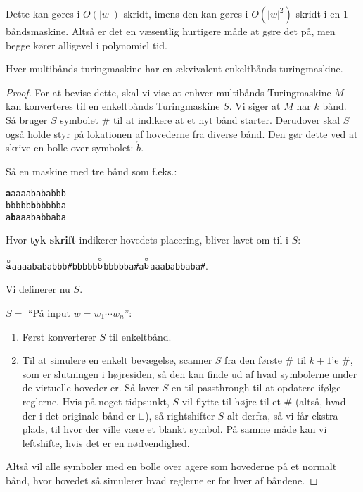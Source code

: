 Dette kan gøres i $O(|w|)$ skridt, imens den kan gøres i $O(|w|^{2})$ skridt i en 1-båndsmaskine. Altså er det en væsentlig hurtigere måde at gøre det på, men begge kører alligevel i polynomiel tid.


\begin{theorem}
	\label{teo:multitapeequiv}
	Hver multibånds turingmaskine har en ækvivalent enkeltbånds turingmaskine.
\end{theorem}

\begin{proof}
	For at bevise dette, skal vi vise at enhver multibånds Turingmaskine $M$ kan konverteres til en enkeltbånds Turingmaskine $S$. Vi siger at $M$ har $k$ bånd. Så bruger $S$ symbolet \# til at indikere at et nyt bånd starter. Derudover skal $S$ også holde styr på lokationen af hovederne fra diverse bånd. Den gør dette ved at skrive en bolle over symbolet: $\mathring{b}$.

	Så en maskine med tre bånd som f.eks.:\\
	\begin{center}
		\noindent
		\texttt{\textbf{a}aaaabababbb}\\
		\noindent
		\texttt{bbbbb\textbf{b}bbbbba}\\
		\noindent
		\texttt{a\textbf{b}aaababbaba}\\
	\end{center}
	Hvor \textbf{tyk skrift} indikerer hovedets placering, bliver lavet om til i $S$:
	\begin{center}
		\texttt{$\stackrel{\circ}{\text{\texttt{a}}}$aaaabababbb\#bbbbb$\stackrel{\circ}{\text{\texttt{b}}}$bbbbba\#a$\stackrel{\circ}{\text{\texttt{b}}}$aaababbaba\#}.
	\end{center}

	Vi definerer nu $S$.

	$S = $ ``På input $w = w_{1} \cdots w_{n}$'':
	\begin{enumerate}
		\item Først konverterer $S$ til enkeltbånd.
		\item Til at simulere en enkelt bevægelse, scanner $S$ fra den første \# til $k+1$'e \#, som er slutningen i højresiden, så den kan finde ud af hvad symbolerne under de virtuelle hoveder er. Så laver $S$ en til passthrough til at opdatere ifølge reglerne. Hvis på noget tidpsunkt, $S$ vil flytte til højre til et $\#$ (altså, hvad der i det originale bånd er $\sqcup$), så rightshifter $S$ alt derfra, så vi får ekstra plads, til hvor der ville være et blankt symbol. På samme måde kan vi leftshifte, hvis det er en nødvendighed.
	\end{enumerate}

	Altså vil alle symboler med en bolle over agere som hovederne på et normalt bånd, hvor hovedet så simulerer hvad reglerne er for hver af båndene.
\end{proof}

